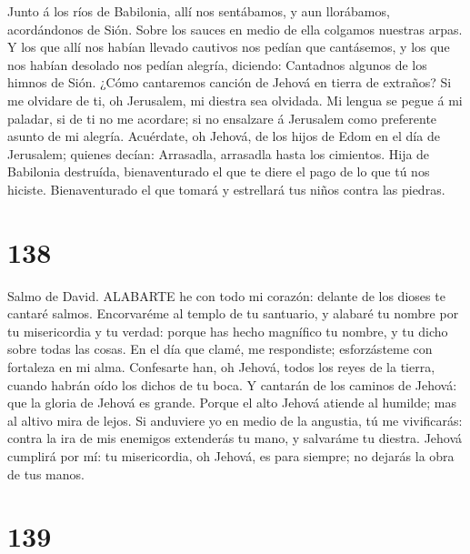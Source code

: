  Junto á los ríos de Babilonia, allí nos sentábamos, y aun
llorábamos, acordándonos de Sión.  Sobre los sauces en medio
de ella colgamos nuestras arpas.  Y los que allí nos habían
llevado cautivos nos pedían que cantásemos, y los que nos habían
desolado nos pedían alegría, diciendo:  Cantadnos algunos de
los himnos de Sión. ¿Cómo cantaremos canción de Jehová en tierra de
extraños?  Si me olvidare de ti, oh Jerusalem, mi diestra
sea olvidada.  Mi lengua se pegue á mi paladar, si de ti no
me acordare; si no ensalzare á Jerusalem como preferente asunto de mi
alegría.  Acuérdate, oh Jehová, de los hijos de Edom en el
día de Jerusalem; quienes decían: Arrasadla, arrasadla hasta los
cimientos.  Hija de Babilonia destruída, bienaventurado el
que te diere el pago de lo que tú nos hiciste. 
Bienaventurado el que tomará y estrellará tus niños contra las piedras.

\hypertarget{section-137}{%
\section{138}\label{section-137}}

 Salmo de David. ALABARTE he con todo mi corazón: delante de
los dioses te cantaré salmos.  Encorvaréme al templo de tu
santuario, y alabaré tu nombre por tu misericordia y tu verdad: porque
has hecho magnífico tu nombre, y tu dicho sobre todas las cosas.
 En el día que clamé, me respondiste; esforzásteme con
fortaleza en mi alma.  Confesarte han, oh Jehová, todos los
reyes de la tierra, cuando habrán oído los dichos de tu boca.
 Y cantarán de los caminos de Jehová: que la gloria de
Jehová es grande.  Porque el alto Jehová atiende al humilde;
mas al altivo mira de lejos.  Si anduviere yo en medio de la
angustia, tú me vivificarás: contra la ira de mis enemigos extenderás tu
mano, y salvaráme tu diestra.  Jehová cumplirá por mí: tu
misericordia, oh Jehová, es para siempre; no dejarás la obra de tus
manos.

\hypertarget{section-138}{%
\section{139}\label{section-138}}

